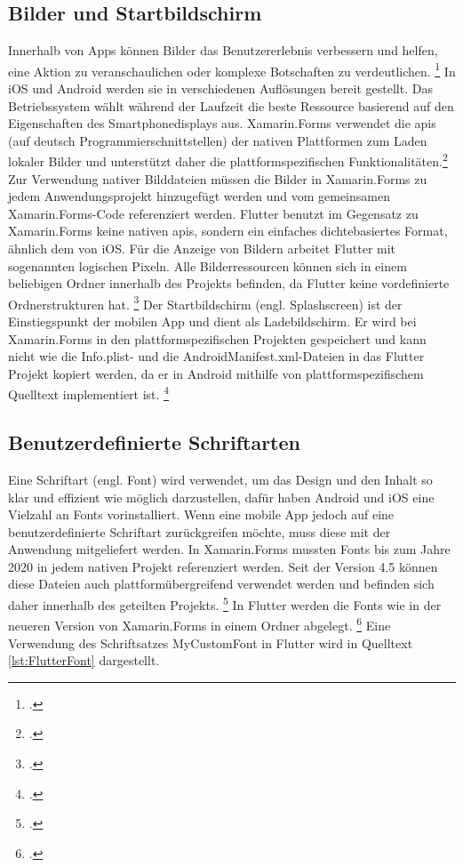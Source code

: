 \subsection{Bilder und Startbildschirm}
Innerhalb von Apps können Bilder das Benutzererlebnis verbessern und helfen,  eine Aktion zu veranschaulichen oder komplexe Botschaften zu verdeutlichen.  \footcite[Vgl.][Abgerufen am \today]{GoogleMaterialImages2020} In iOS und Android werden sie in verschiedenen Auflösungen bereit gestellt.  Das Betriebssystem wählt während der Laufzeit die beste Ressource basierend auf den Eigenschaften des Smartphonedisplays aus.  Xamarin.Forms verwendet die  \acfp{api} (auf deutsch Programmierschnittstellen) der nativen Plattformen zum Laden lokaler Bilder und unterstützt daher die plattformspezifischen Funktionalitäten.\footcite[Vgl.][Abgerufen am \today]{MicrosoftXamImages2020} Zur Verwendung nativer Bilddateien müssen die Bilder in Xamarin.Forms zu jedem Anwendungsprojekt hinzugefügt werden und vom gemeinsamen Xamarin.Forms-Code referenziert werden.  Flutter benutzt im Gegensatz zu Xamarin.Forms keine nativen \acp{api},  sondern ein einfaches dichtebasiertes Format,  ähnlich dem von iOS.  Für die Anzeige von Bildern arbeitet Flutter mit sogenannten logischen Pixeln.  Alle Bilderressourcen können sich in einem beliebigen Ordner innerhalb des Projekts befinden, da Flutter keine vordefinierte Ordnerstrukturen hat. \footcite[Vgl.][Abgerufen am \today]{GoogleFlutterImages2020} Der Startbildschirm (engl. Splashscreen) ist der Einstiegspunkt der mobilen App und dient als Ladebildschirm.  Er wird bei Xamarin.Forms in den plattformspezifischen Projekten gespeichert und kann nicht wie die \glq Info.plist\grq - und die \glq AndroidManifest.xml\grq{}-Dateien in das Flutter Projekt kopiert werden,  da er in Android mithilfe von plattformspezifischem Quelltext implementiert ist. \footcite[Vgl.][Abgerufen am \today]{GoogleSplash2020} 


\subsection{Benutzerdefinierte Schriftarten}
Eine Schriftart (engl. Font) wird verwendet,  um das Design und den Inhalt so klar und effizient wie möglich darzustellen,  dafür haben Android und iOS  eine Vielzahl an Fonts vorinstalliert.  Wenn eine mobile App jedoch auf eine benutzerdefinierte Schriftart zurückgreifen möchte,  muss diese mit der Anwendung mitgeliefert werden.  In Xamarin.Forms mussten Fonts bis zum Jahre 2020 in jedem nativen Projekt referenziert werden.  Seit der Version 4.5 können diese Dateien auch plattformübergreifend verwendet werden und befinden sich daher innerhalb des geteilten Projekts. \footcite[Vgl.][Abgerufen am \today]{Versluis2020}  In Flutter werden die Fonts wie in der neueren Version von Xamarin.Forms in einem Ordner abgelegt. \footcite[Vgl.][Abgerufen am \today]{GoogleFlutterFonts2020}  Eine Verwendung des Schriftsatzes \glq MyCustomFont\grq{} in Flutter wird in Quelltext \ref{lst:FlutterFont} dargestellt.  

